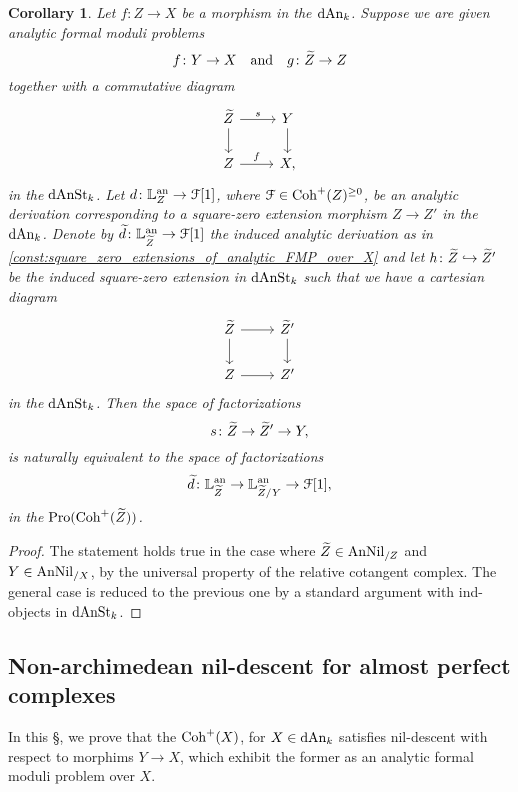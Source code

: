 \documentclass[10pt,a4paper,reqno]{amsart} %
\theoremstyle{plain}
\newtheorem{cor}[thm]{Corollary}
\theoremstyle{definition}
\theoremstyle{remark}
\numberwithin{equation}{section}
\begin{document}
\begin{cor} \label{cor:universal_property_of_relative_cotangent_complex_for_morphisms_between_analytic_FMP}
    Let $f \colon Z \to X$ be a morphism in the \infcat $\mathrm{dAn}_k$. Suppose we are given analytic formal moduli problems
        \[
            f \colon Y \to X \quad \mathrm{and} \quad g \colon \widetilde Z \to Z
        \]
    together with a commutative diagram
        \[
        \begin{tikzcd}
            \tZ \ar{r}{s} \ar{d} & Y \ar{d} \\
            Z \ar{r}{f} & X,  
        \end{tikzcd}
        \]
    in the \infcat $\mathrm{dAnSt}_k$. Let $d \colon \mathbb L^\mathrm{an}_Z \to \mathcal F[1]$, where $\mathcal F \in \mathrm{Coh}^+(Z)^{\ge 0}$, be an analytic derivation corresponding to a square-zero extension morphism
    $Z \to Z'$ in the \infcat $\mathrm{dAn}_k$. Denote by
    $\widetilde{d} \colon \mathbb L^\mathrm{an}_{\widetilde Z} \to \mathcal F[1]$ the induced analytic derivation as in \cref{const:square_zero_extensions_of_analytic_FMP_over_X}
    and let $h \colon \widetilde Z \hookrightarrow \widetilde Z'$ be the induced square-zero extension in $\mathrm{dAnSt}_k$ such that we have a cartesian diagram
        \[
        \begin{tikzcd}
            \tZ \ar{r} \ar{d} & \tZ' \ar{d} \\
            Z \ar{r} & Z'  
        \end{tikzcd}
        \]
    in the \infcat $\mathrm{dAnSt}_k$. Then the space of factorizations
        \[
            s \colon \widetilde Z \to \widetilde Z' \to Y,  
        \]
    is naturally equivalent to the space of factorizations
        \[
            \widetilde{d} \colon \mathbb L^\mathrm{an}_{\widetilde Z} \to  \mathbb L^\mathrm{an}_{\widetilde Z/ Y} \to \mathcal F[1]  ,
        \]
    in the \infcat $\mathrm{Pro}(\mathrm{Coh}^+(\widetilde Z))$.
\end{cor}

\begin{proof}
    The statement holds true in the case where $\widetilde Z \in \mathrm{AnNil}_{/Z}$ and $Y \in \mathrm{AnNil}_{/X}$, by the universal property of the relative cotangent complex.
    The general case is reduced to the previous one by a standard argument with ind-objects in $\mathrm{dAnSt}_k$.
\end{proof}


\subsection{Non-archimedean nil-descent for almost perfect complexes}
In this \S, we prove that the \infcat $\mathrm{Coh}^+(X)$, for $X \in \mathrm{dAn}_k$ satisfies nil-descent with respect to morphims $Y \to X$, which exhibit
the former as an analytic formal moduli problem over $X$.
\end{document}
